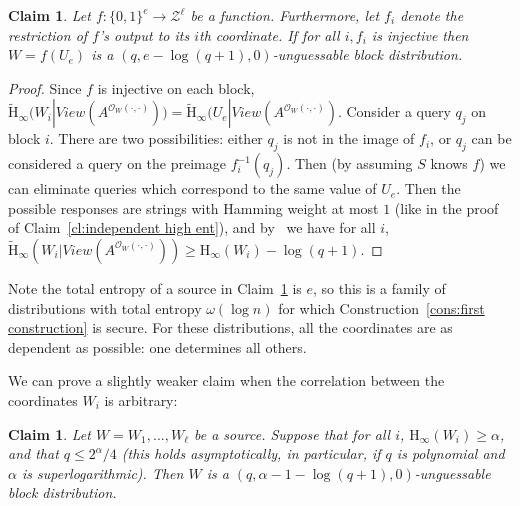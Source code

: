 \documentclass[11pt]{article}
\newcommand{\clref}[1]{\mbox{Claim~\ref{#1}}}
\newcommand{\consref}[1]{\mbox{Construction~\ref{#1}}}
\newcommand{\zo}{\ensuremath{\{0, 1\}}}
\newcommand{\Hoo}{\mathrm{H}_\infty}
\newcommand{\Hav}{\tilde{\mathrm{H}}_\infty}
\newtheorem{claim}[theorem]{Claim}
\begin{document}
\begin{claim}
\label{cl:each block from single seed}
Let $f:\zo^e \rightarrow \mathcal{Z}^\ell$ be a function.  Furthermore, let $f_i$ denote the restriction of $f$'s output to its $i$th coordinate.  If for all $i, f_i$ is injective then $W = f(U_e)$ is a $( q, e - \log (q+1), 0)$-unguessable block distribution.
\end{claim}
\begin{proof}
Since $f$ is injective on each block, $\Hav(W_i | View(A^{\mathcal{O}_{W}(\cdot, \cdot)})) = \Hav(U_e | View(A^{\mathcal{O}_{W}(\cdot, \cdot)})$.  Consider a query $q_j$ on block $i$.  There are two possibilities: either $q_j$ is not in the image of $f_i$,  or $q_j$ can be considered a query on the preimage $f_i^{-1}(q_j)$. Then (by assuming $S$ knows $f$) we can eliminate queries which correspond to the same value of $U_e$.  Then the possible responses are strings with Hamming weight at most $1$ (like in the 
proof of \clref{cl:independent high ent}),
 and by~\cite[Lemma 2.2]{DBLP:journals/siamcomp/DodisORS08} we have for all $i$, $\Hav(W_i | View(A^{\mathcal{O}_{W}(\cdot, \cdot)})) \geq \Hoo(W_i) -\log (q+1)$.
\end{proof}

Note the total entropy of a source in \clref{cl:each block from single seed} is $e$, so this is a family of distributions with total entropy $\omega(\log n)$ for which \consref{cons:first construction} is secure.  For these distributions, all the coordinates are as dependent as possible: one determines all others.

We can prove a slightly weaker claim when the correlation between the coordinates $W_i$ is arbitrary:

\begin{claim}
\label{cl:all blocks entropy}
Let $W = W_1,..., W_\ell$ be a source.  Suppose that for all $i$, $\Hoo(W_i)\geq \alpha$, and that $q \le 2^{\alpha}/4$ (this holds asymptotically, in particular, if $q$ is polynomial and $\alpha$ is superlogarithmic). Then  $W$ is a $(q, \alpha-1-\log(q+1), 0)$-unguessable block distribution.
\end{claim}
\end{document}
